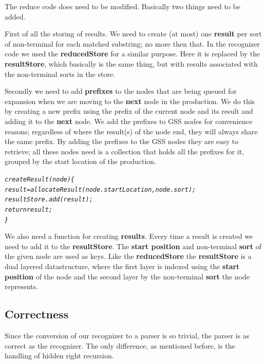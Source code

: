 \documentclass[a4paper,10pt]{article}
\begin{document}
The reduce code does need to be modified. Basically two things need to be added.

First of all the storing of results. We need to create (at most) one {\bf result} per sort of non-terminal for each matched substring; no more then that. In the recognizer code we used the {\bf reducedStore} for a similar purpose. Here it is replaced by the {\bf resultStore}, which basically is the same thing, but with results associated with the non-terminal sorts in the store.

Secondly we need to add {\bf prefixes} to the nodes that are being queued for expansion when we are moving to the {\bf next} node in the production. We do this by creating a new prefix using the prefix of the current node and its result and adding it to the {\bf next} node. We add the prefixes to GSS nodes for convenience reasons; regardless of where the result(s) of the node end, they will always share the same prefix. By adding the prefixes to the GSS nodes they are easy to retrieve; all these nodes need is a collection that holds all the prefixes for it, grouped by the start location of the production.

{\small
\begin{alltt}
\textit{createResult(node)\{
  result = allocateResult(node.startLocation, node.sort);
  resultStore.add(result);
  return result;
\}}
\end{alltt}
}

\pagebreak
We also need a function for creating {\bf results}. Every time a result is created we need to add it to the {\bf resultStore}. The {\bf start position} and non-terminal {\bf sort} of the given node are used as keys. Like the {\bf reducedStore} the {\bf resultStore} is a dual layered datastructure, where the first layer is indexed using the {\bf start position} of the node and the second layer by the non-terminal {\bf sort} the node represents.

\subsection{Correctness}
\label{sec:parserCorrectness}

Since the conversion of our recognizer to a parser is so trivial, the parser is as correct as the recognizer. The only difference, as mentioned before, is the handling of hidden right recursion.
\end{document}
